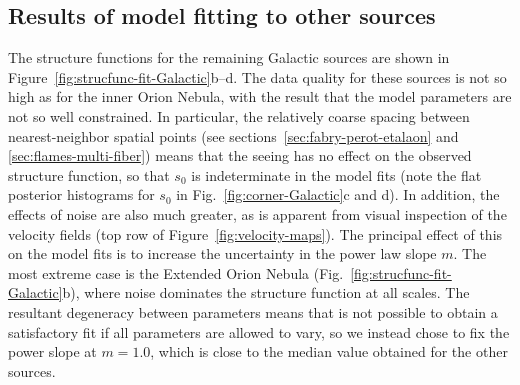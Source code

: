 \documentclass[fleqn,usenatbib, useAMS, a4paper]{mnras}
\newcommand\pos{\ensuremath{_{\mathrm{pos}}}}
\begin{document}
\subsection{Results of model fitting to other sources}
\label{sec:results-model-fitt}

The structure functions for the remaining Galactic sources
are shown in Figure~\ref{fig:strucfunc-fit-Galactic}b--d.
The data quality for these sources is not so high as for the inner Orion Nebula,
with the result that the model parameters are not so well constrained.
In particular, the relatively coarse spacing between nearest-neighbor spatial points
(see sections~\ref{sec:fabry-perot-etalaon} and \ref{sec:flames-multi-fiber})
means that the seeing has no effect on the observed structure function,
so that \(s_0\) is indeterminate in the model fits
(note the flat posterior histograms for \(s_0\) in Fig.~\ref{fig:corner-Galactic}c and d).
In addition, the effects of noise are also much greater,
as is apparent from visual inspection of the velocity fields
(top row of Figure~\ref{fig:velocity-maps}).
The principal effect of this on the model fits is to increase the uncertainty
in the power law slope \(m\).
The most extreme case is the Extended Orion Nebula (Fig.~\ref{fig:strucfunc-fit-Galactic}b),
where noise dominates the structure function at all scales.
The resultant degeneracy between parameters means that
is not possible to obtain a satisfactory fit
if all parameters are allowed to vary,
so we instead chose to fix the power slope at \(m = 1.0\),
which is close to the median value obtained for the other sources.



\end{document}
